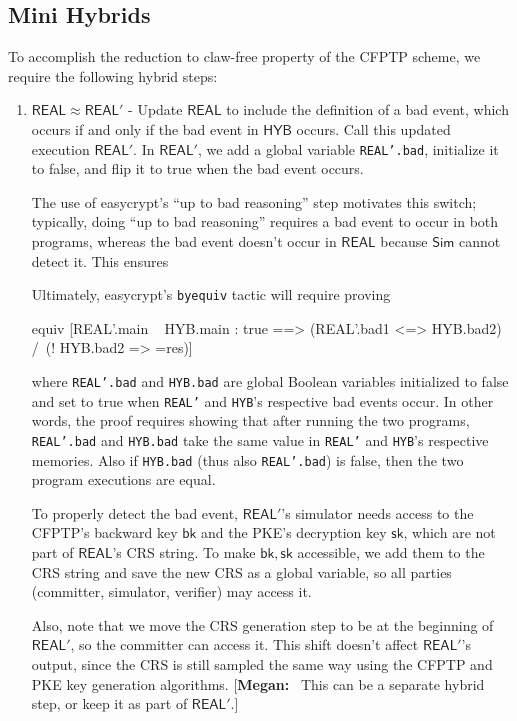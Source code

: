 \documentclass{article}[12pt]
\newcommand{\authnote}[2]{[{\color{red}\textbf{#1:}}~{\color{blue} #2}]}
\newcommand{\authnote}[2]{}
\newcommand{\megan}[1]{\authnote{Megan}{#1}}
\newcommand{\code}[1]{\texttt{#1}} %
\newcommand{\DecKey}{\mathsf{sk}}
\newcommand{\BackKey}{\mathsf{bk}}
\newcommand{\Simulator}{{\mathsf{Sim}}} %
\newcommand{\Hyb}{{\mathsf{HYB}}}
\newcommand{\Real}{{\mathsf{REAL}}}
\begin{document}
\subsection{Mini Hybrids}
To accomplish the reduction to claw-free property of the CFPTP scheme, we require the following hybrid steps:
\begin{enumerate}
	\item\label{hyb:1.1} $\Real \approx \Real'$ - Update $\Real$ to include the definition of a bad event, which occurs if and only if the bad event in $\Hyb$ occurs. Call this updated execution $\Real'$. In $\Real'$, we add a global variable \code{REAL'.bad}, initialize it to false, and flip it to true when the bad event occurs.

	The use of easycrypt's ``up to bad reasoning'' step motivates this switch; typically, doing ``up to bad reasoning'' requires a bad event to occur in both programs, whereas the bad event doesn't occur in $\Real$ because $\Simulator$ cannot detect it. This ensures

	Ultimately, easycrypt's \code{byequiv} tactic will require proving

\begin{easycrypt}[label=code:up_to_bad_claim, caption=Claim required to utilize ``up to bad reasoning'']
equiv [REAL'.main ~ HYB.main : true ==> (REAL'.bad{1} <=> HYB.bad{2}) /\ (! HYB.bad{2} => ={res})]
\end{easycrypt}

	where \code{REAL'.bad} and \code{HYB.bad} are global Boolean variables initialized to false and set to true when \code{REAL'} and \code{HYB}'s respective bad events occur. In other words, the proof requires showing that after running the two programs, \code{REAL'.bad} and \code{HYB.bad} take the same value in \code{REAL'} and \code{HYB}'s respective memories. Also if \code{HYB.bad} (thus also \code{REAL'.bad}) is false, then the two program executions are equal.

	To properly detect the bad event, $\Real'$'s simulator needs access to the CFPTP's backward key $\BackKey$ and the PKE's decryption key $\DecKey$, which are not part of $\Real$'s CRS string. To make $\BackKey, \DecKey$ accessible, we add them to the CRS string and save the new CRS as a global variable, so all parties (committer, simulator, verifier) may access it.

	Also, note that we move the CRS generation step to be at the beginning of $\Real'$, so the committer can access it. This shift doesn't affect $\Real'$'s output, since the CRS is still sampled the same way using the CFPTP and PKE key generation algorithms. \megan{This can be a separate hybrid step, or keep it as part of $\Real'$.}


\end{enumerate}
\end{document}
